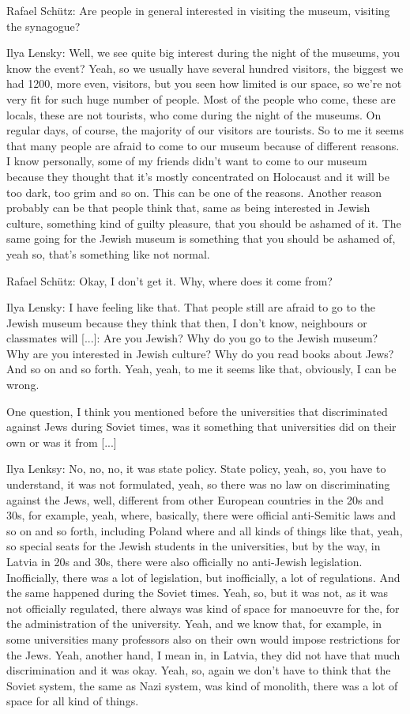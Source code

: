 Rafael Schütz: Are people in general interested in visiting the museum, visiting the synagogue? 

Ilya Lensky: Well, we see quite big interest during the night of the museums, you know the event? Yeah, so we usually have several hundred visitors, the biggest we had 1200, more even, visitors, but you seen how limited is our space, so we’re not very fit for such huge number of people. Most of the people who come, these are locals, these are not tourists, who come during the night of the museums. On regular days, of course, the majority of our visitors are tourists. So to me it seems that many people are afraid to come to our museum because of different reasons. I know personally, some of my friends didn’t want to come to our museum because they thought that it’s mostly concentrated on Holocaust and it will be too dark, too grim and so on. This can be one of the reasons. Another reason probably can be that people think that, same as being interested in Jewish culture, something kind of guilty pleasure, that you should be ashamed of it. The same going for the Jewish museum is something that you should be ashamed of, yeah so, that’s something like not normal. 

Rafael Schütz: Okay, I don’t get it. Why, where does it come from? 

Ilya Lensky: I have feeling like that. That people still are afraid to go to the Jewish museum because they think that then, I don’t know, neighbours or classmates will [...]: Are you Jewish? Why do you go to the Jewish museum? Why are you interested in Jewish culture? Why do you read books about Jews? And so on and so forth. Yeah, yeah, to me it seems like that, obviously, I can be wrong. 

One question, I think you mentioned before the universities that discriminated against Jews during Soviet times, was it something that universities did on their own or was it from [...] 

Ilya Lenksy: No, no, no, it was state policy. 
State policy, yeah, so, you have to understand, it was not formulated, yeah, so there was no law on discriminating against the Jews, well, different from other European countries in the 20s and 30s, for example, yeah, where, basically, there were official anti-Semitic laws and so on and so forth, including Poland where  and all kinds of things like that, yeah, so special seats for the Jewish students in the universities, but by the way, in Latvia in 20s and 30s, there were also officially no anti-Jewish legislation. Inofficially, there was a lot of legislation, but inofficially, a lot of regulations. And the same happened during the Soviet times. Yeah, so, but it was not, as it was not officially regulated, there always was kind of space for manoeuvre for the, for the administration of the university. Yeah, and we know that, for example, in some universities many professors also on their own would impose restrictions for the Jews. Yeah, another hand, I mean in, in Latvia, they did not have that much discrimination and it was okay. Yeah, so, again we don’t have to think that the Soviet system, the same as Nazi system, was kind of monolith, there was a lot of space for all kind of things. 

